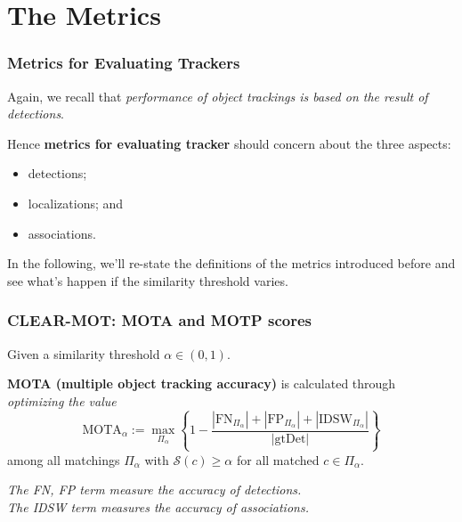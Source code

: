\documentclass[slidetop, mathserif, dvipsnames]{beamer}
\begin{document}
\section{The Metrics}

\begin{frame}
	\frametitle{Metrics for Evaluating Trackers}
			
	Again, we recall that \emph{performance of object trackings is based 
	on the result of detections}.
			
	\vspace{5pt}

	Hence {\bf metrics for evaluating tracker} should concern about the three aspects:
	\begin{itemize}
		\item detections;%
		\item localizations; and%
		\item associations.%
	\end{itemize}

	\quad

	In the following, we'll re-state the definitions of the
	metrics introduced before and see what's happen if the similarity threshold
	varies.
	

\end{frame}


\begin{frame}
	\frametitle{CLEAR-MOT: MOTA and MOTP scores}
			
			
	Given a similarity threshold $\alpha\in (0,1)$.
			
	\vspace{4pt}
			
	{\bf MOTA (multiple object tracking accuracy)} is calculated through
	\emph{optimizing the value}
	\[
		\text{MOTA}_\alpha :=
		\max_{\Pi_\alpha}
		\left\{1 - \dfrac{|\text{FN}_{\Pi_\alpha}| + |\text{FP}_{\Pi_\alpha}| + |\text{IDSW}_{\Pi_\alpha}|}{|\text{gtDet}|}\right\}
	\]
	among all matchings $\Pi_\alpha$ with $\mathcal S(c)\geq \alpha$ for all matched $c\in\Pi_\alpha$.
			
	\vspace{4pt}
			
	\emph{\color{blue} The FN, FP term measure the accuracy of detections.} \\
	\emph{\color{olive} The IDSW term measures the accuracy of associations.}
			
	\vspace{4pt}
		
			
\end{frame}
\end{document}
